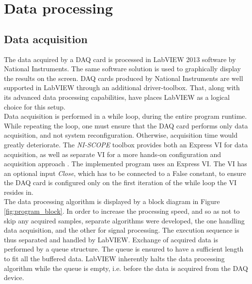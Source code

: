 \documentclass{standalone}
\begin{document}
\chapter{Data processing} \label{ch:data_processing}
\setcounter{page}\thestranica


\section{Data acquisition}

The data acquired by a DAQ card is processed in LabVIEW 2013 software by National Instruments. The same software solution is used to graphically display the results on the screen. DAQ cards produced by National Instruments are well supported in LabVIEW through an additional driver-toolbox. That, along with its advanced data processing capabilities, have places LabVIEW as a logical choice for this setup. \\

Data acquisition is performed in a while loop, during the entire program runtime. While repeating the loop, one must ensure that the DAQ card performs only data acquisition, and not system reconfiguration. Otherwise, acquisition time would greatly deteriorate. The \textit{NI-SCOPE} toolbox provides both an Express VI for data acquisition, as well as separate VI for a more hands-on configuration and acquisition approach \cite{labview:niscope}. The implemented program uses an Express VI. The VI has an optional input \textit{Close}, which has to be connected to a False constant, to ensure the DAQ card is configured only on the first iteration of the while loop the VI resides in. \\

The data processing algorithm is displayed by a block diagram in Figure \ref{fig:program_block}.
In order to increase the processing speed, and so as not to skip any acquired samples, separate algorithms were developed, the one handling data acquisition, and the other for signal processing. The execution sequence is thus separated and handled by LabVIEW. Exchange of acquired data is performed by a queue structure. The queue is ensured to have a sufficient length to fit all the buffered data. LabVIEW inherently halts the data processing algorithm while the queue is empty, i.e. before the data is acquired from the DAQ device. \\
\end{document}
